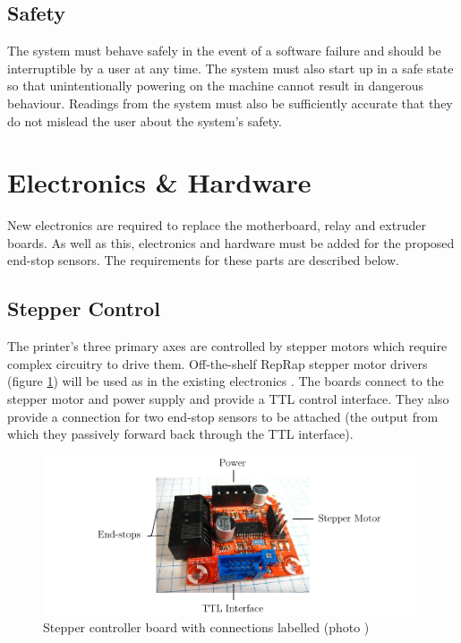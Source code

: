 		\subsection{Safety}
			
			The system must behave safely in the event of a software failure and
			should be interruptible by a user at any time. The system must also start
			up in a safe state so that unintentionally powering on the machine cannot
			result in dangerous behaviour. Readings from the system must also be
			sufficiently accurate that they do not mislead the user about the system's
			safety.
	
	\section{Electronics \& Hardware}
		
		New electronics are required to replace the motherboard, relay and extruder
		boards. As well as this, electronics and hardware must be added for the
		proposed end-stop sensors. The requirements for these parts are described
		below.
		
		\subsection{Stepper Control}
			
			The printer's three primary axes are controlled by stepper motors which
			require complex circuitry to drive them. Off-the-shelf RepRap stepper
			motor drivers (figure \ref{fig:stepperControllerBoard}) will be used as in
			the existing electronics \cite{stepperMotorDriver23}. The boards connect
			to the stepper motor and power supply and provide a TTL control interface.
			They also provide a connection for two end-stop sensors to be attached
			(the output from which they passively forward back through the TTL
			interface).
			
			\begin{figure}
				\includegraphics[width=1\textwidth]{diagrams/stepperControllerBoard.pdf}
				\caption{Stepper controller board with connections labelled (photo \cite{stepperControllerBoardPhoto})}
				\label{fig:stepperControllerBoard}
			\end{figure}
			
